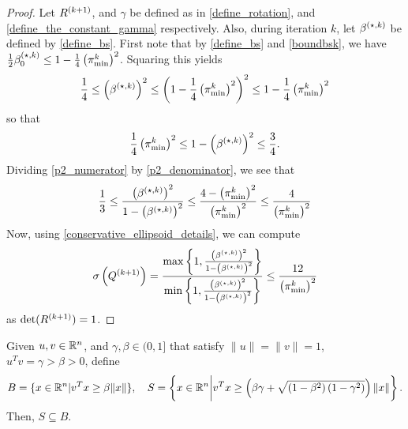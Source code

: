 \begin{proof}
Let ${R^{(k+1)}}$, and $\gamma$ be defined as in \cref{define_rotation}, and \cref{define_the_constant_gamma} respectively.
Also, during iteration $k$, let ${\beta^{(\star, k)}}$ be defined by \cref{define_bs}.
First note that by \cref{define_bs} and \cref{boundbsk}, we have
$\frac 1 2 {\beta_0^{(\star, k)}} \le 1 - \frac 1 4 \left({\pi^k_{\textrm{min}}}\right)^2$.
Squaring this yields
\begin{align}
\frac {1} 4 \le \left({\beta^{(\star, k)}}\right)^2 \le \left(1 - \frac 1 4 \left({\pi^k_{\textrm{min}}}\right)^2\right)^2 \le 1 - \frac 1 4 \left({\pi^k_{\textrm{min}}}\right)^2 \label{p2_numerator}
\end{align}
so that
\begin{align}
\frac 1 4  \left({\pi^k_{\textrm{min}}}\right)^2 \le 1 - \left({\beta^{(\star, k)}}\right)^2 \le \frac 3 4. \label{p2_denominator}
\end{align}
Dividing \cref{p2_numerator} by \cref{p2_denominator}, we see that
\begin{align*}
\frac 1 3
\le \frac{\left({\beta^{(\star, k)}}\right)^2}{1 - \left({\beta^{(\star, k)}}\right)^2}
\le \frac {4 - \left({\pi^k_{\textrm{min}}}\right)^2}{\left({\pi^k_{\textrm{min}}}\right)^2} \le \frac {4}{\left({\pi^k_{\textrm{min}}}\right)^2}
\end{align*}
Now, using \cref{conservative_ellipsoid_details}, we can compute 
\begin{align*}
{\sigma} \left({Q^{(k+1)}}\right) 
= \frac{\max\left\{1, \frac{\left({\beta^{(\star, k)}}\right)^2}{1 - \left({\beta^{(\star, k)}}\right)^2}\right\}}{\min\left\{1, \frac{\left({\beta^{(\star, k)}}\right)^2}{1 - \left({\beta^{(\star, k)}}\right)^2}\right\}} 
\le \frac {12}{\left({\pi^k_{\textrm{min}}}\right)^2}
\end{align*}
as $\det({R^{(k+1)}}) = 1$.
\end{proof}




\begin{lemma}
\label{cone_subset_cone}
Given $u, v \in \mathbb R^n$, and $\gamma, \beta \in (0, 1]$ that satisfy $\|u\| = \|v\|= 1$, $u^Tv = \gamma > \beta > 0$, define
\begin{align*}
B = \{x\in\mathbb R^n | {v}^Tx \ge \beta\|x\|\}, \quad
S = \left\{x\in\mathbb R^n \bigg| v^Tx \ge \left(\beta\gamma + \sqrt{(1 - \beta^2)\left(1 - \gamma^2\right)}\right)\|x\| \right\}. 
\end{align*}
Then, $S \subseteq B$.
\end{lemma}

